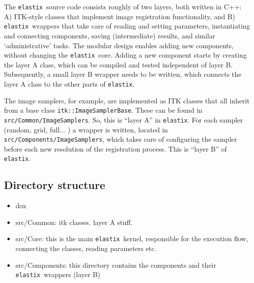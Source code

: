 \documentclass[]{report}
\newcommand{\elastix}{\texttt{elastix}}
\begin{document}
The \elastix\ source code consists roughly of two layers, both
written in C++: A) ITK-style classes that implement image
registration functionality, and B) \elastix\ wrappers that take care
of reading and setting parameters, instantiating and connecting
components, saving (intermediate) results, and similar
`administrative' tasks. The modular design enables adding new
components, without changing the \elastix\ core. Adding a new
component starts by creating the layer A class, which can be
compiled and tested independent of layer B. Subsequently, a small
layer B wrapper needs to be written, which connects the layer A
class to the other parts of \elastix.

The image samplers, for example, are implemented as ITK classes that
all inherit from a base class \texttt{itk::ImageSamplerBase}. These
can be found in \texttt{src/Common/ImageSamplers}. So, this is
``layer A'' in \elastix. For each sampler (random, grid, full... ) a
wrapper is written, located in
\texttt{src/Components/ImageSamplers}, which takes care of
configuring the sampler before each new resolution of the
registration process. This is ``layer B'' of \elastix.

\subsection{Directory structure}

\begin{itemize}
\item dox
\item src/Common: itk classes. layer A stuff.
\item src/Core: this is the main \elastix\ kernel, responsible for the
    execution flow, connecting the classes, reading parameters etc.
\item src/Components: this directory contains the components and their
    \elastix\ wrappers (layer B)
\end{itemize}
\end{document}

